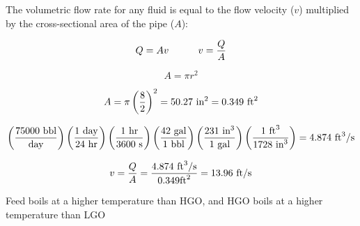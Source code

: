





The volumetric flow rate for any fluid is equal to the flow velocity ($v$) multiplied by the cross-sectional area of the pipe ($A$):

$$Q = Av \hskip 30pt v = {Q \over A}$$

$$A = \pi r^2$$

$$A = \pi \left(8 \over 2 \right)^2 = 50.27 \hbox{ in}^2 = 0.349 \hbox{ ft}^2$$

$$\left(75000 \hbox{ bbl} \over \hbox{day} \right) \left(1 \hbox{ day} \over 24 \hbox{ hr} \right) \left( 1 \hbox{ hr} \over 3600 \hbox{ s} \right)  \left( 42 \hbox{ gal} \over 1 \hbox{ bbl} \right)  \left( 231 \hbox{ in}^3 \over 1 \hbox{ gal} \right)  \left( 1 \hbox{ ft}^3 \over 1728 \hbox{ in}^3 \right) = 4.874 \hbox{ ft}^3\hbox{/s}$$

$$v = {Q \over A} = {4.874 \hbox{ ft}^3\hbox{/s} \over 0.349 \hbox{ft}^2} = 13.96 \hbox{ ft/s}$$

\vskip 20pt

Feed boils at a higher temperature than HGO, and HGO boils at a higher temperature than LGO












